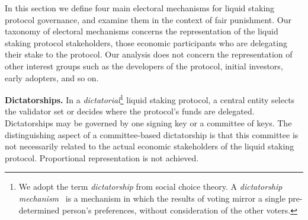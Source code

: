 

In this section we define four main electoral mechanisms for liquid staking
protocol governance, and examine them in the context of fair punishment.
Our taxonomy of electoral mechanisms concerns the representation of the liquid
staking protocol stakeholders, those economic participants who are delegating
their stake to the protocol. Our analysis does not concern the representation of
other interest groups such as the developers of the protocol, initial investors,
early adopters, and so on.

\noindent
\textbf{Dictatorships.}
In a \emph{dictatorial}\footnote{We adopt the term \emph{dictatorship} from
social choice theory. A \emph{dictatorship mechanism}~\cite{arrow} is a mechanism in which
the results of voting mirror a single pre-determined person's preferences, without
consideration of the other voters.}
liquid staking protocol, a central entity
selects the validator set or decides where the protocol's funds
are delegated.
Dictatorships may be governed by one signing key or a
committee of keys. The distinguishing aspect of a committee-based dictatorship
is that this committee is not necessarily related to the actual economic stakeholders
of the liquid staking protocol.
Proportional representation is not
achieved.

